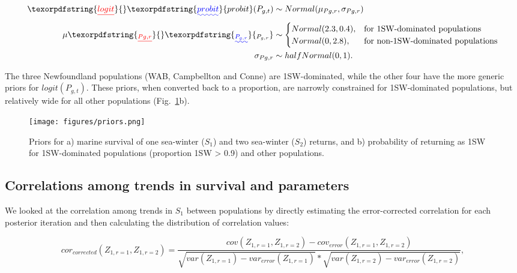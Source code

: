 \documentclass[12pt]{article}
\newcommand{\So}{$S_{1}$\xspace}
\newcommand{\St}{$S_{2}$\xspace}
\providecommand{\DIFaddtex}[1]{{\protect\color{blue}\uwave{#1}}} %
\providecommand{\DIFdeltex}[1]{{\protect\color{red}\sout{#1}}}                      %
\providecommand{\DIFaddbegin}{} %
\providecommand{\DIFaddend}{} %
\providecommand{\DIFdelbegin}{} %
\providecommand{\DIFdelend}{} %
\providecommand{\DIFadd}[1]{\texorpdfstring{\DIFaddtex{#1}}{#1}} %
\providecommand{\DIFdel}[1]{\texorpdfstring{\DIFdeltex{#1}}{}} %
\begin{document}
\begin{align}
    \DIFdelbegin \DIFdel{logit}\DIFdelend \DIFaddbegin \DIFadd{probit}\DIFaddend (P_{g,t}) &\sim Normal(\mu_{Pg,r}, \sigma_{Pg,r}) \\
    \mu\DIFdelbegin \DIFdel{_{Pg,r} }\DIFdelend \DIFaddbegin \DIFadd{_{P_{g,r}} }\DIFaddend &\sim
    \begin{cases}
       Normal(2.3, 0.4),  &\text{for 1SW-dominated populations} \\
       Normal(0, 2.8), &\text{for non-1SW-dominated populations} \\
   \end{cases} \\
    \sigma_{Pg,r} &\sim halfNormal(0, 1).
\end{align}

The three Newfoundland populations (WAB, Campbellton and Conne) are
1SW-dominated, while the other four have the more generic priors for \DIFdelbegin \DIFdel{$logit(P_{g,t})$}\DIFdelend \DIFaddbegin \DIFadd{$probit(P_{g,t})$}\DIFaddend .
These priors, when converted back to a proportion, are narrowly constrained
for 1SW-dominated populations, but relatively wide for all other populations
(Fig.~\ref{fig:priors}b).

\begin{figure}[htbp]
 \centering
    \texttt{[image: figures/priors.png]} \caption{Priors
        for a) marine survival of one sea-winter (\So) and two sea-winter
        (\St) returns, and b) probability of returning as 1SW for
        1SW-dominated populations (proportion 1SW > 0.9) and other populations.}
    \label{fig:priors}

\end{figure}
\subsection*{Correlations among trends in survival and parameters}

We looked at the correlation among trends in \So between populations by
directly estimating the error-corrected correlation for each posterior
iteration and then calculating the distribution of correlation values:

\begin{equation}
cor_{corrected}(Z_{1,r=1},Z_{1,r=2}) = \frac{cov(Z_{1,r=1}, Z_{1,r=2}) - cov_{error}(Z_{1,r=1}, Z_{1,r=2})}{\sqrt{var(Z_{1,r=1}) - var_{error}(Z_{1,r=1})}*\sqrt{var(Z_{1,r=2}) - var_{error}(Z_{1,r=2})}}, \label{eq:corz1}
\end{equation}
\end{document}
